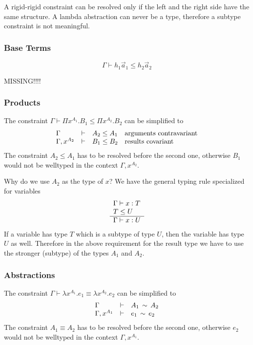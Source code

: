 A rigid-rigid constraint can be resolved only if the left and the right side
have the same structure. A lambda abstraction can never be a type, therefore a
subtype constraint is not meaningful.








\subsubsection{Base Terms}


$$
    \Gamma \vdash h_1 \vec a_1 \le h_2 \vec a_2
$$

MISSING!!!!


\subsubsection{Products}

The constraint $\Gamma \vdash \Pi x^{A_1}. B_1 \le \Pi x^{A_2}. B_2$ can be
simplified to
$$
    \begin{array}{lllll} 
        \Gamma          & \vdash & A_2 \le A_1
        &\text{arguments contravariant}
        \\
        \Gamma, x^{A_2} & \vdash & B_1 \le B_2
        &\text{results covariant}
     \end{array}
$$
%
The constraint $A_2 \le A_1$ has to be resolved before the second one,
otherwise $B_1$ would not be welltyped in the context $\Gamma, x^{A_2}$.

Why do we use $A_2$ as the type of $x$? We have the general typing rule
specialized for variables
$$
    \begin{array}{l} 
        \Gamma \vdash x : T
        \\
        T \le U
     \\ \hline 
        \Gamma \vdash x: U
     \end{array}
$$
If a variable has type $T$ which is a subtype of type $U$, then the variable has
type $U$ as well. Therefore in the above requirement for the result type we have
to use the stronger (subtype) of the types $A_1$ and $A_2$.




\subsubsection{Abstractions}

The constraint $\Gamma \vdash \lambda x^{A_1}. e_1 \equiv \lambda x^{A_2}. e_2$
can be simplified to
$$
    \begin{array}{lllll} 
        \Gamma          & \vdash & A_1 \,\sim\, A_2
        \\
        \Gamma, x^{A_1} & \vdash & e_1 \,\sim\, e_2
     \end{array}
$$
%
The constraint $A_1 \equiv A_2$ has to be resolved before the second one,
otherwise $e_2$ would not be welltyped in the context $\Gamma, x^{A_1}$.
